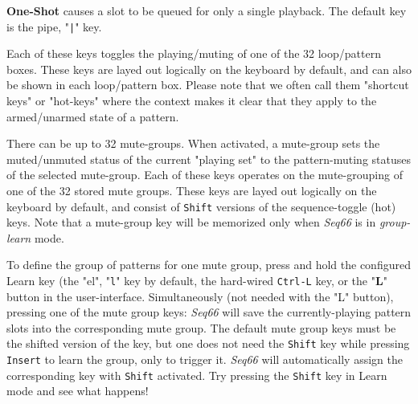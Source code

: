    \textbf{One-Shot}
   causes a slot to be queued for only a single playback.
   The default key is the pipe, "\texttt{|}" key.

   Each of these keys toggles the playing/muting of one of the 32
   loop/pattern boxes.
   These keys are layed out logically on the keyboard by default,
   and can also be shown in each loop/pattern box.
   Please note that we often call them "shortcut keys" or "hot-keys"
   where the context
   makes it clear that they apply to the armed/unarmed state of a pattern.

   There can be up to 32 mute-groups.
   When activated, a mute-group
   sets the muted/unmuted status of the current "playing set"
   to the pattern-muting statuses of the selected mute-group.
   Each of these keys operates on the mute-grouping of one of the 32
   stored mute groups.
   These keys are layed out logically on the keyboard by default, and consist
   of \texttt{Shift} versions of the sequence-toggle (hot) keys.
   Note that a mute-group key will be memorized only when
   \textsl{Seq66} is in
   \textsl{group-learn} mode.



   To define the group of patterns for one mute group, press and hold the
   configured Learn key (the "el", "\texttt{l}" key by default,
   the hard-wired \texttt{Ctrl-L} key, or the "\textbf{L}"
   button in the user-interface.
   Simultaneously (not needed with the "L" button),
   pressing one of the mute group keys: \textsl{Seq66}
   will save the currently-playing pattern slots into the corresponding mute
   group.
   The default mute group keys must be the shifted version of the key,
   but one does not need the \texttt{Shift} key while pressing
   \texttt{Insert} to learn the group, only to trigger it.
   \textsl{Seq66} will automatically assign the corresponding key with
   \texttt{Shift} activated.  Try pressing the \texttt{Shift} key in Learn mode
   and see what happens!

